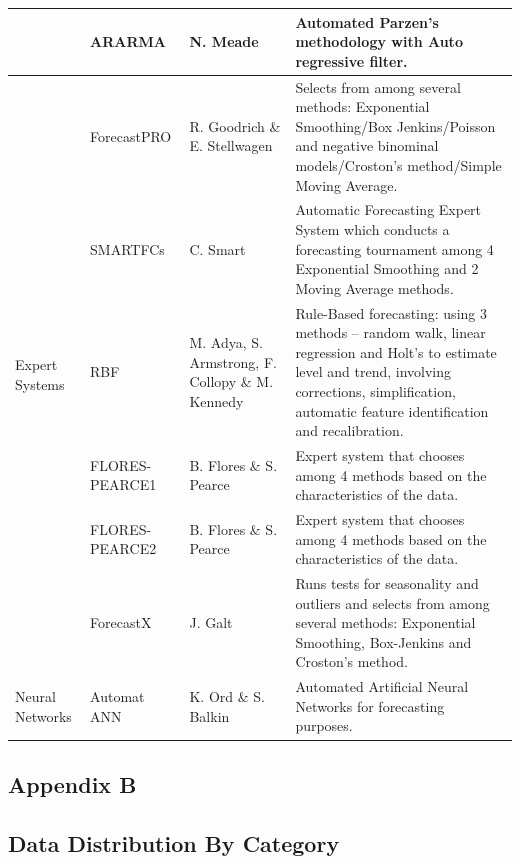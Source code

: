 \documentclass[12pt,a4paper]{article}
\begin{document}
\begin{table}[htbp]
{\begin{tabular}{lp{2cm}lp{10cm}}
  & ARARMA & N. Meade & Automated Parzen’s methodology with Auto regressive filter. \\ 
  \midrule
  \multirow{6}{*}{Expert Systems} & ForecastPRO & R. Goodrich \& E. Stellwagen & Selects from among several methods: Exponential Smoothing/Box Jenkins/Poisson and negative binominal models/Croston’s method/Simple Moving Average. \\
  & SMARTFCs & C. Smart & Automatic Forecasting Expert System which conducts a forecasting tournament among 4 Exponential Smoothing and 2 Moving Average methods. \\
  & RBF & M. Adya, S. Armstrong, F. Collopy \& M. Kennedy & Rule-Based forecasting: using 3 methods – random walk, linear regression and Holt’s to estimate level and trend, involving corrections, simplification, automatic feature identification and recalibration. \\
  & FLORES-PEARCE1 & B. Flores \& S. Pearce & Expert system that chooses among 4 methods based on the characteristics of the data. \\
  & FLORES-PEARCE2 & B. Flores \& S. Pearce & Expert system that chooses among 4 methods based on the characteristics of the data. \\
  & ForecastX & J. Galt & Runs tests for seasonality and outliers and selects from among several methods: Exponential Smoothing, Box-Jenkins and Croston’s method. \\ 
  \midrule
  \multirow{1}{*}{Neural Networks} & Automat ANN & K. Ord \& S. Balkin & Automated Artificial Neural Networks for forecasting purposes. \\ 
  \bottomrule
  \end{tabular}%
  }
\end{table}

\newpage

\begin{center}
  \item  \section*{Appendix B} \label{appendix_b}
\end{center}


\subsection*{Data Distribution By Category}
\end{document}
